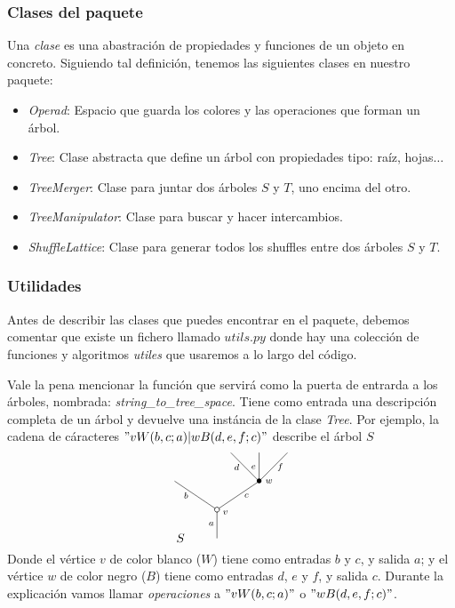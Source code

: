 \documentclass[../main.tex]{subfiles}
\begin{document}
\subsubsection*{Clases del paquete}
\begin{defi}
    Una \emph{clase} es una abastraci\'on de propiedades y funciones de un objeto en concreto.
    Siguiendo tal definici\'on, tenemos las siguientes clases en nuestro paquete:
    \begin{itemize}
        \item \emph{Operad}: Espacio que guarda los colores y las operaciones que forman un \'arbol.
        \item \emph{Tree}: Clase abstracta que define un \'arbol con propiedades tipo: ra\'iz, hojas$\dots$
        \item \emph{TreeMerger}: Clase para juntar dos \'arboles $S$ y $T$, uno encima del otro.
        \item \emph{TreeManipulator}: Clase para buscar y hacer intercambios.
        \item \emph{ShuffleLattice}: Clase para generar todos los shuffles entre dos \'arboles $S$ y $T$.
    \end{itemize}
\end{defi}

\subsubsection*{Utilidades}
Antes de describir las clases que puedes encontrar en el paquete, debemos comentar que existe un fichero llamado $utils.py$ donde hay una colecci\'on de funciones y algoritmos \emph{utiles} que usaremos a lo largo del c\'odigo.

Vale la pena mencionar la funci\'on que servir\'a como la puerta de entrarda a los \'arboles, nombrada: \emph{string\_to\_tree\_space}. Tiene como entrada una descripci\'on completa de un \'arbol y devuelve una inst\'ancia de la clase \emph{Tree}. Por ejemplo,
la cadena de c\'aracteres $"vW(b,c;a)|wB(d,e,f;c)"$ describe el \'arbol $S$
$$
    \xy
    <0.08cm, 0cm>:
    (0.0, 0.0)*{}="1"; %
    (0.0, 10.0)*\cir<2pt>{}="2"; %
    (-15.0, 20.0)*{}="3"; %
    (15.0, 20.0)*={\bullet}="7"; %
    (5.0, 30.0)*{}="8"; %
    (15.0, 30.0)*{}="9"; %
    (25.0, 30.0)*{}="10"; %
    "1";"2" **\dir{-};
    "2";"3" **\dir{-};
    "2";"7" **\dir{-};
    "7";"8" **\dir{-};
    "7";"9" **\dir{-};
    "7";"10" **\dir{-};
    (3.0, 9.0)*=0{\scriptstyle v};
    (18.5, 20.0)*=0{\scriptstyle w};
    (-2.0, 5.0)*=0{\scriptstyle a};
    (-11, 15.0)*=0{\scriptstyle b};
    (10.5, 15.0)*=0{\scriptstyle c};
    (7.0, 25.0)*=0{\scriptstyle d};
    (13.0, 25.0)*=0{\scriptstyle e};
    (22.5, 25.0)*=0{\scriptstyle f};
    (-13,0)*{S};
    \endxy
$$
Donde el v\'ertice $v$ de color blanco ($W$) tiene como entradas $b$ y $c$, y salida $a$; y el v\'ertice $w$ de color negro ($B$) tiene como entradas $d$, $e$ y $f$, y salida $c$.
Durante la explicaci\'on vamos llamar \emph{operaciones} a $"vW(b,c;a)"$ o $"wB(d,e,f;c)"$.
\end{document}
